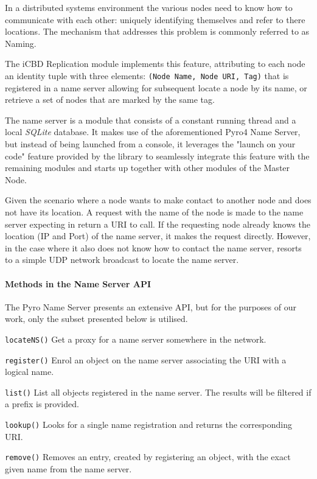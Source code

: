 In a distributed systems environment the various nodes need to know how to communicate with each other: uniquely identifying themselves and refer to there locations. The mechanism that addresses this problem is commonly referred to as Naming.~\cite{tanenbaum_2006}

The iCBD Replication module implements this feature, attributing to each node an identity tuple with three elements: \texttt{(Node Name, Node URI, Tag)} that is registered in a name server allowing for subsequent locate a node by its name, or retrieve a set of nodes that are marked by the same tag.

The name server is a module that consists of a constant running thread and a local \textit{SQLite} database. It makes use of the aforementioned Pyro4 Name Server, but instead of being launched from a console, it leverages the "launch on your code" feature provided by the library to seamlessly integrate this feature with the remaining modules and starts up together with other modules of the Master Node.

Given the scenario where a node wants to make contact to another node and does not have its location. A request with the name of the node is made to the name server expecting in return a URI to call. If the requesting node already knows the location (IP and Port) of the name server, it makes the request directly. However, in the case where it also does not know how to contact the name server, resorts to a simple UDP network broadcast to locate the name server.

\paragraph{Methods in the Name Server API}

The Pyro Name Server presents an extensive API, but for the purposes of our work, only the subset presented below is utilised. 

\begin{description}
	\item \texttt{locateNS()} Get a proxy for a name server somewhere in the network.
	\item \texttt{register()} Enrol an object on the name server associating the URI with a logical name.
	\item \texttt{list()} List all objects registered in the name server. The results will be filtered if a prefix is provided.
	\item \texttt{lookup()} Looks for a single name registration and returns the corresponding URI.
	\item \texttt{remove()} Removes an entry, created by registering an object, with the exact given name from the name server.
\end{description}


